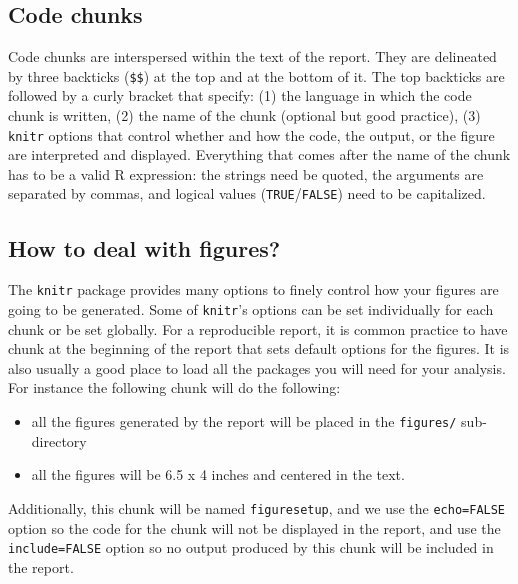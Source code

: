 \documentclass[
]{book}
\providecommand{\tightlist}{%
  \setlength{\itemsep}{0pt}\setlength{\parskip}{0pt}}
\theoremstyle{definition}
\theoremstyle{definition}
\theoremstyle{definition}
\theoremstyle{definition}
\theoremstyle{remark}
\begin{document}
\hypertarget{code-chunks}{%
\subsection{Code chunks}\label{code-chunks}}

Code chunks are interspersed within the text of the report. They are delineated by three backticks (\texttt{\$\textasciigrave{}\textasciigrave{}\textasciigrave{}\$}) at the top and at the bottom of it. The top backticks are followed by a curly bracket that specify: (1) the language in which the code chunk is written, (2) the name of the chunk (optional but good practice), (3) \texttt{knitr} options that control whether and how the code, the output, or the figure are interpreted and displayed. Everything that comes after the name of the chunk has to be a valid R expression: the strings need be quoted, the arguments are separated by commas, and logical values (\texttt{TRUE}/\texttt{FALSE}) need to be capitalized.

\hypertarget{how-to-deal-with-figures}{%
\subsection{How to deal with figures?}\label{how-to-deal-with-figures}}

The \texttt{knitr} package provides many options to finely control how your figures are going to be generated. Some of \texttt{knitr}'s options can be set individually for each chunk or be set globally. For a reproducible report, it is common practice to have chunk at the beginning of the report that sets default options for the figures. It is also usually a good place to load all the packages you will need for your analysis. For instance the following chunk will do the following:

\begin{itemize}
\tightlist
\item
  all the figures generated by the report will be placed in the \texttt{figures/} sub-directory
\item
  all the figures will be 6.5 x 4 inches and centered in the text.
\end{itemize}

Additionally, this chunk will be named \texttt{figuresetup}, and we use the \texttt{echo=FALSE} option so the code for the chunk will not be displayed in the report, and use the \texttt{include=FALSE} option so no output produced by this chunk will be included in the report.
\end{document}
